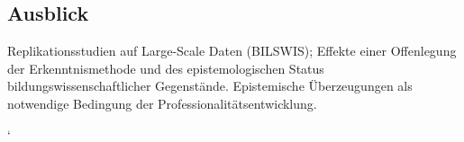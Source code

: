 \documentclass[]{tufte-handout}
\begin{document}
\subsection{Ausblick}\label{ausblick}

Replikationsstudien auf Large-Scale Daten (BILSWIS); Effekte einer
Offenlegung der Erkenntnismethode und des epistemologischen Status
bildungswissenschaftlicher Gegenstände. Epistemische Überzeugungen als
notwendige Bedingung der Professionalitätsentwicklung.

`


\end{document}
